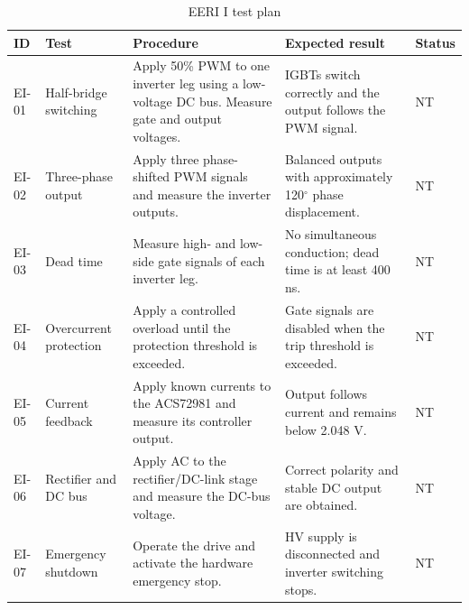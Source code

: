 \begin{table}[htbp]
    \centering
    \caption{EERI I test plan}
    \label{tab:eeri-i-tests}

    \renewcommand{\arraystretch}{1.2}
    \footnotesize

    \begin{tabularx}{\textwidth}{|l|X|X|X|l|}
        \hline
        \textbf{ID} &
        \textbf{Test} &
        \textbf{Procedure} &
        \textbf{Expected result} &
        \textbf{Status} \\
        \hline

        EI-01 &
        Half-bridge switching &
        Apply 50\% PWM to one inverter leg using a low-voltage DC bus. Measure gate and output voltages. &
        IGBTs switch correctly and the output follows the PWM signal. &
        NT \\
        \hline

        EI-02 &
        Three-phase output &
        Apply three phase-shifted PWM signals and measure the inverter outputs. &
        Balanced outputs with approximately 120$^\circ$ phase displacement. &
        NT \\
        \hline

        EI-03 &
        Dead time &
        Measure high- and low-side gate signals of each inverter leg. &
        No simultaneous conduction; dead time is at least 400 ns. &
        NT \\
        \hline

        EI-04 &
        Overcurrent protection &
        Apply a controlled overload until the protection threshold is exceeded. &
        Gate signals are disabled when the trip threshold is exceeded. &
        NT \\
        \hline

        EI-05 &
        Current feedback &
        Apply known currents to the ACS72981 and measure its controller output. &
        Output follows current and remains below 2.048 V. &
        NT \\
        \hline

        EI-06 &
        Rectifier and DC bus &
        Apply AC to the rectifier/DC-link stage and measure the DC-bus voltage. &
        Correct polarity and stable DC output are obtained. &
        NT \\
        \hline

        EI-07 &
        Emergency shutdown &
        Operate the drive and activate the hardware emergency stop. &
        HV supply is disconnected and inverter switching stops. &
        NT \\
        \hline

    \end{tabularx}
\end{table}

